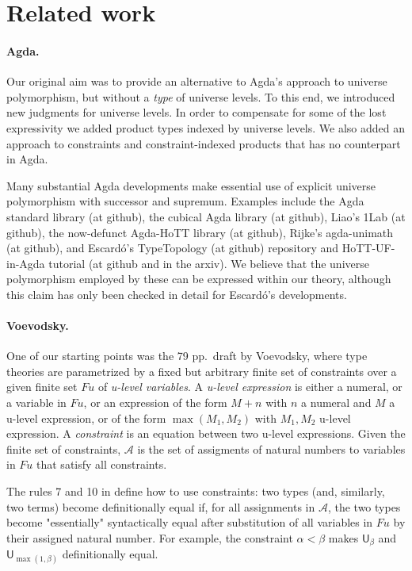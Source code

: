 \documentclass[11pt,a4paper]{article}
\theoremstyle{definition}
\newcommand{\UU}{\mathsf{U}}
\newcommand{\AFu}{\mathcal{A}}
\newcommand{\Fu}{\mathit{Fu}}
\begin{document}
\section{Related work}\label{sec:related}

\paragraph{Agda.} Our original aim was to provide an alternative to Agda's approach to universe polymorphism, but without a {\em type} of universe levels. To this end, we introduced new judgments for universe levels. In order to compensate for some of the lost expressivity we added product types indexed by universe levels. We also added an approach to constraints and constraint-indexed products that has no counterpart in Agda.

Many substantial Agda developments make essential use of explicit universe polymorphism with successor and supremum. Examples include the Agda standard library (at github), the cubical Agda library (at github), Liao's 1Lab (at github), the now-defunct Agda-HoTT library (at github), Rijke's agda-unimath (at
github), and Escard\'o's TypeTopology (at github) repository and 
HoTT-UF-in-Agda tutorial (at github and in the arxiv). We believe that the universe polymorphism employed by these can be expressed within our theory, although this claim has only been checked in detail for Escard\'o's developments.

\paragraph{Voevodsky.} One of our starting points was the 79 pp.\ draft \cite{VV} by Voevodsky, where type theories are parametrized by a fixed but arbitrary finite set of constraints over a given finite
set $\Fu$ of \emph{u-level variables}. A \emph{u-level expression} \cite[Def. 2.0.2]{VV} is either a numeral,
or a variable in $\Fu$, or an expression of the form $M+n$ with $n$
a numeral and $M$ a u-level expression, or of the form $\max(M_1,M_2)$
with $M_1,M_2$ u-level expression. A \emph{constraint} is an equation
between two u-level expressions. Given the finite set of constraints,
$\AFu$ is the set of assigments of natural numbers to variables
in $\Fu$ that satisfy all constraints.

The rules 7 and 10 in \cite[Section 3.4]{VV} define how to use constraints:
two types (and, similarly, two terms) become definitionally equal
if, for all assignments in $\AFu$, the two types become "essentially"
syntactically equal after substitution of all variables in $\Fu$ by
their assigned natural number. For example, the constraint
$\alpha < \beta$ makes $\UU_\beta$ and $\UU_{\max(1,\beta)}$
definitionally equal.
\end{document}

